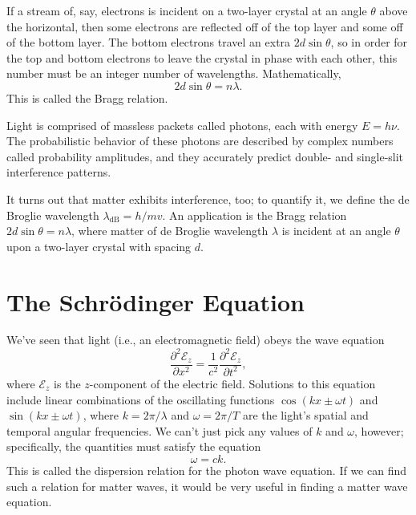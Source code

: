 \documentclass[../p052main.tex]{subfiles}
\begin{document}
If a stream of, say, electrons is incident on a two-layer crystal at an angle $\theta$ above the horizontal, then some electrons are reflected off of the top layer and some off of the bottom layer.
The bottom electrons travel an extra $2d\sin\theta$, so in order for the top and bottom electrons to leave the crystal in phase with each other, this number must be an integer number of wavelengths.
Mathematically,
\[ 2d \sin\theta = n \lambda. \]
This is called the Bragg relation.

\begin{summary}
    Light is comprised of massless packets called photons, each with energy $E = h\nu$.
    The probabilistic behavior of these photons are described by complex numbers called probability amplitudes, and they accurately predict double- and single-slit interference patterns.

    It turns out that matter exhibits interference, too; to quantify it, we define the de Broglie wavelength $\lambda_\textrm{dB} = h / mv$.
    An application is the Bragg relation $2d \sin \theta = n \lambda$, where matter of de Broglie wavelength $\lambda$ is incident at an angle $\theta$ upon a two-layer crystal with spacing $d$.
\end{summary}

\section{The Schrödinger Equation}%
We've seen that light (i.e., an electromagnetic field) obeys the wave equation
\[ \frac{\partial^2 \mathcal{E}_z}{\partial x^2} = \frac{1}{c^2} \frac{\partial^2 \mathcal{E}_z}{\partial t^2}, \]
where $\mathcal{E}_z$ is the $z$-component of the electric field.
Solutions to this equation include linear combinations of the oscillating functions $\cos (kx \pm \omega t)$ and $\sin (kx \pm \omega t)$, where $k = 2\pi / \lambda$ and $\omega = 2\pi / T$ are the light's spatial and temporal angular frequencies.
We can't just pick any values of $k$ and $\omega$, however; specifically, the quantities must satisfy the equation
\[ \omega = ck. \]
This is called the dispersion relation for the photon wave equation.
If we can find such a relation for matter waves, it would be very useful in finding a matter wave equation.
\end{document}
